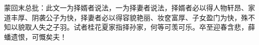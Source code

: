 \begin{parag}
    \begin{note}蒙回末总批：此文一为择婿者说法，一为择妻者说法，择婿者必以得人物轩昂、家道丰厚、阴袭公子为快，择妻者必以得容貌艳丽、妆奁富厚、子女盈门为快，殊不知以貌取人失之子羽。试者桂花夏家指择孙家，何等可羡可乐。卒至迎春含悲，薛蟠遗恨，可慨矣夫！\end{note}
\end{parag}
